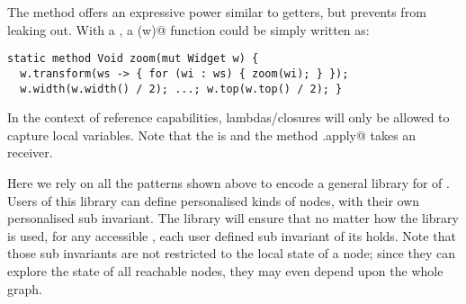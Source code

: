 The \Q@transform@ method offers an expressive power similar to \Q@mut@ getters, but prevents \Q@Widgets@ from leaking out.  With a \Q@Transformer@, a \Q@zoom(w)@ function could be simply written as:
\begin{lstlisting}
static method Void zoom(mut Widget w) {
  w.transform(ws -> { for (wi : ws) { zoom(wi); } });
  w.width(w.width() / 2); ...; w.top(w.top() / 2); }
\end{lstlisting}

In the context of reference capabilities, \Q@imm@ lambdas/closures will only be allowed to capture \Q@imm@ local variables.
Note that the \Q@Transformer@ is \Q@imm@ and the method \Q@Trasformer.apply@ takes an \Q@imm@ receiver.






Here we rely on all the patterns shown above to encode a general library for \Q@Graph@s
of \Q@Node@s.
Users of this library can define personalised kinds of nodes,
with their own personalised sub invariant.
The library will ensure that no matter how the library is used, for any accessible \Q@Graph@, each user defined sub invariant of its \Q@Node@s holds.
Note that those sub invariants are not restricted to the local state of a node; since they can explore the state of all reachable nodes, they may even depend upon the whole graph.

